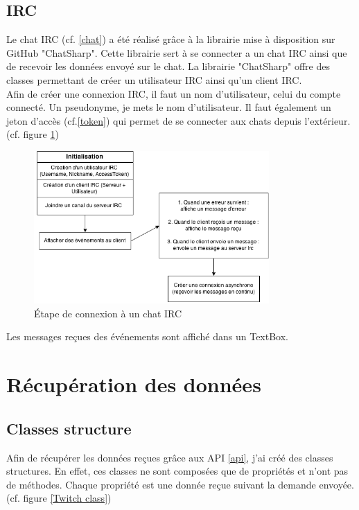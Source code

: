 \documentclass[11pt]{report} %
\begin{document}
		\subsection{IRC}
		\label{IRC}
		Le chat IRC (cf. \ref{chat}) a été réalisé grâce à la librairie mise à disposition sur GitHub "ChatSharp". Cette librairie sert à se connecter a un chat IRC ainsi que de recevoir les données envoyé sur le chat.
		La librairie "ChatSharp" offre des classes permettant de créer un utilisateur IRC ainsi qu'un client IRC. \\
		
		Afin de créer une connexion IRC, il faut un nom d'utilisateur, celui du compte connecté. Un pseudonyme, je mets le nom d'utilisateur. Il faut également un jeton d'accès (cf.\ref{token}) qui permet de se connecter aux chats depuis l'extérieur. (cf. figure \ref{IrcChat})
		
		\begin{figure}[h]
			\center
			\includegraphics[width=0.8\textwidth]{../img/IrcChat.png}
			\caption{Étape de connexion à un chat IRC}
			\label{IrcChat}
		\end{figure}
		
		Les messages reçues des événements sont affiché dans un TextBox.

	\newpage
	\section{Récupération des données}
		\subsection{Classes structure}
		Afin de récupérer les données reçues grâce aux API \ref{api}, j'ai créé des classes structures. En effet, ces classes ne sont composées que de propriétés et n'ont pas de méthodes. Chaque propriété est une donnée reçue suivant la demande envoyée. (cf. figure \ref{Twitch class})
		
\end{document}
